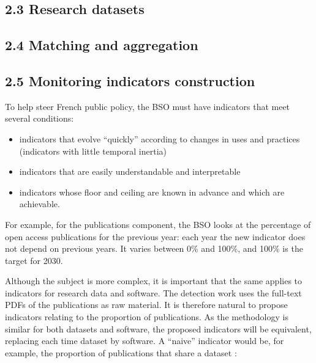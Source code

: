 \documentclass[
]{article}
\begin{document}
\citep{GROBID} \citep{du_softcite_2021}

\hypertarget{research-datasets}{%
\subsection{2.3 Research datasets}\label{research-datasets}}

\hypertarget{matching-and-aggregation}{%
\subsection{2.4 Matching and
aggregation}\label{matching-and-aggregation}}

\hypertarget{monitoring-indicators-construction}{%
\subsection{2.5 Monitoring indicators
construction}\label{monitoring-indicators-construction}}

To help steer French public policy, the BSO must have indicators that
meet several conditions:

\begin{itemize}
\item
  indicators that evolve ``quickly'' according to changes in uses and
  practices (indicators with little temporal inertia)
\item
  indicators that are easily understandable and interpretable
\item
  indicators whose floor and ceiling are known in advance and which are
  achievable.
\end{itemize}

For example, for the publications component, the BSO looks at the
percentage of open access publications for the previous year: each year
the new indicator does not depend on previous years. It varies between
0\% and 100\%, and 100\% is the target for 2030.

Although the subject is more complex, it is important that the same
applies to indicators for research data and software. The detection work
uses the full-text PDFs of the publications as raw material. It is
therefore natural to propose indicators relating to the proportion of
publications. As the methodology is similar for both datasets and
software, the proposed indicators will be equivalent, replacing each
time dataset by software. A ``naive'' indicator would be, for example,
the proportion of publications that share a dataset :
\end{document}
